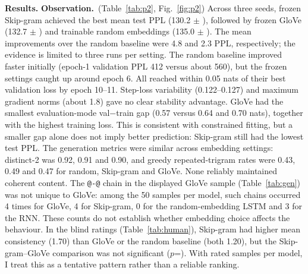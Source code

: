 \documentclass[10pt]{article}
\newcommand{\obs}{\textbf{Observation.}~}
\begin{document}
\textbf{Results.} \obs (Table~\ref{tab:p2}, Fig.~\ref{fig:p2}) Across three seeds, frozen Skip-gram achieved the
best mean test PPL (130.2 $\pm$ \sdlstmwtwov), followed by frozen GloVe (132.7 $\pm$ \sdlstmglove) and trainable
random embeddings (135.0 $\pm$ \sdlstm). The mean improvements over the random baseline were 4.8 and 2.3 PPL,
respectively; the evidence is limited to three runs per setting. The random baseline improved faster initially
(epoch-1 validation PPL 412 versus about 560), but the frozen settings caught up around epoch 6. All reached within
0.05 nats of their best validation loss by epoch 10--11. Step-loss variability (0.122--0.127) and maximum gradient
norms (about 1.8) gave no clear stability advantage. GloVe had the smallest evaluation-mode val$-$train gap (0.57
versus 0.64 and 0.70 nats), together with the highest training loss. This is consistent with constrained fitting,
but a smaller gap alone does not imply better prediction: Skip-gram still had the lowest test PPL.
The generation metrics were similar across embedding settings: distinct-2 was 0.92, 0.91 and 0.90, and greedy
repeated-trigram rates were 0.43, 0.49 and 0.47 for random, Skip-gram and GloVe. None reliably maintained coherent
content. The \texttt{@-@} chain in the displayed GloVe sample (Table~\ref{tab:gen}) was not unique to GloVe: among
the 50 samples per model, such chains occurred 4 times for GloVe, 4 for Skip-gram, 0 for the random-embedding LSTM
and 3 for the RNN. These counts do not establish whether embedding choice affects the behaviour. In the blind
ratings (Table~\ref{tab:human}), Skip-gram had higher mean consistency (1.70) than GloVe or the random baseline
(both 1.20), but the Skip-gram--GloVe comparison was not significant ($p$=\heSgGloveCon). With \heItems{} rated
samples per model, I treat this as a tentative pattern rather than a reliable ranking.
\end{document}
